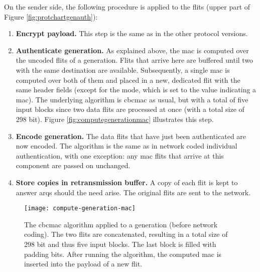 On the sender side, the following procedure is applied to the flits (upper part of Figure \ref{fig:protchartgenauth}):
\begin{enumerate}
    \item \textbf{Encrypt payload.} This step is the same as in the other protocol versions.
    \item \textbf{Authenticate generation.} As explained above, the \gls{mac} is computed over the uncoded flits of a generation. Flits that arrive
        here are buffered until two with the same destination are available. Subsequently, a single \gls{mac} is computed over both of them and placed
        in a new, dedicated flit with the same header fields (except for the mode, which is set to the value indicating a \gls{mac}). The underlying
        algorithm is \gls{cbcmac} as usual, but with a total of five input blocks since two data flits are processed at once (with a total size of 298
        bit). Figure \vref{fig:computegenerationmac} illustrates this step.
    \item \textbf{Encode generation.} The data flits that have just been authenticated are now encoded. The algorithm is the same as in network coded
        individual authentication, with one exception: any \gls{mac} flits that arrive at this component are passed on unchanged.
    \item \textbf{Store copies in retransmission buffer.} A copy of each flit is kept to answer \glspl{arq} should the need arise. The original flits
        are sent to the network.
\end{enumerate}
\vspace{0.5\baselineskip}

\begin{figure}
    \centering
    \texttt{[image: compute-generation-mac]}
    \caption[CBC-MAC algorithm applied to a generation]{The \gls{cbcmac} algorithm applied to a generation (before network coding). The two flits are
    concatenated, resulting in a total size of 298 bit and thus five input blocks. The last block is filled with padding bits. After running the
    algorithm, the computed \gls{mac} is inserted into the payload of a new flit.}
    \label{fig:computegenerationmac}
\end{figure}

